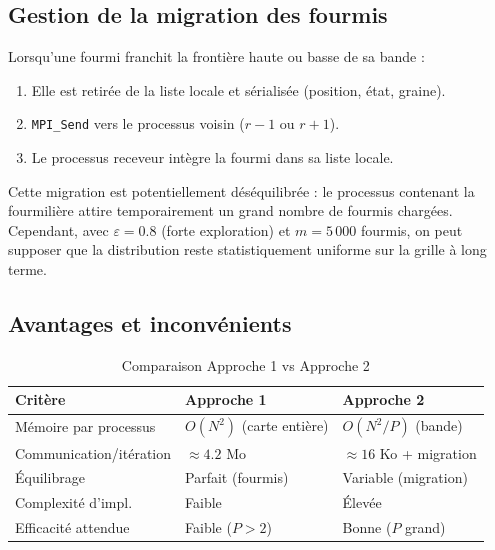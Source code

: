 \subsection{Gestion de la migration des fourmis}

Lorsqu'une fourmi franchit la frontière haute ou basse de sa bande :
\begin{enumerate}
    \item Elle est retirée de la liste locale et sérialisée (position, état, graine).
    \item \texttt{MPI\_Send} vers le processus voisin ($r-1$ ou $r+1$).
    \item Le processus receveur intègre la fourmi dans sa liste locale.
\end{enumerate}
Cette migration est potentiellement déséquilibrée : le processus contenant la fourmilière
attire temporairement un grand nombre de fourmis chargées. Cependant, avec $\varepsilon = 0.8$
(forte exploration) et $m = 5\,000$ fourmis, on peut supposer que la distribution reste
statistiquement uniforme sur la grille à long terme.

\subsection{Avantages et inconvénients}

\begin{table}[h]
\centering
\caption{Comparaison Approche 1 vs Approche 2}
\label{tab:mpi_compare}
\begin{tabular}{lll}
\hline
\textbf{Critère}         & \textbf{Approche 1}    & \textbf{Approche 2} \\
\hline
Mémoire par processus    & $O(N^2)$ (carte entière) & $O(N^2/P)$ (bande) \\
Communication/itération  & $\approx 4.2$ Mo       & $\approx 16$ Ko + migration \\
Équilibrage              & Parfait (fourmis)       & Variable (migration) \\
Complexité d'impl.       & Faible                  & Élevée \\
Efficacité attendue      & Faible ($P > 2$)        & Bonne ($P$ grand) \\
\hline
\end{tabular}
\end{table}

